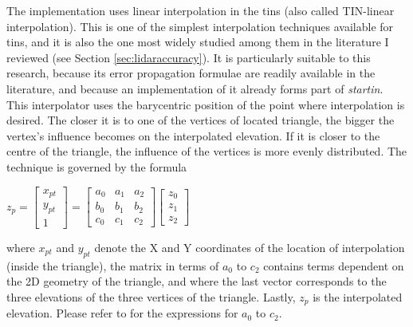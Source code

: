 The implementation uses linear interpolation in the \ac{tin}s (also called TIN-linear interpolation). This is one of the simplest interpolation techniques available for \ac{tin}s, and it is also the one most widely studied among them in the literature I reviewed (see Section \ref{sec:lidaraccuracy}). It is particularly suitable to this research, because its error propagation formulae are readily available in the literature, and because an implementation of it already forms part of \textit{startin}. This interpolator uses the barycentric position of the point where interpolation is desired. The closer it is to one of the vertices of located triangle, the bigger the vertex's influence becomes on the interpolated elevation. If it is closer to the centre of the triangle, the influence of the vertices is more evenly distributed. The technique is governed by the formula

$z_{p} =
\begin{bmatrix}
x_{pt}\\
y_{pt}\\ 
1
\end{bmatrix} =
\begin{bmatrix}
 a_{0} & a_{1} & a_{2} \\
 b_{0} & b_{1} & b_{2} \\
 c_{0} & c_{1} & c_{2}  
\end{bmatrix}
\begin{bmatrix}
z_{0}\\
z_{1}\\ 
z_{2}
\end{bmatrix}$

where $x_{pt}$ and $y_{pt}$ denote the X and Y coordinates of the location of interpolation (inside the triangle), the matrix in terms of $a_{0}$ to $c_{2}$ contains terms dependent on the 2D geometry of the triangle, and where the last vector corresponds to the three elevations of the three vertices of the triangle. Lastly, $z_{p}$ is the interpolated elevation. Please refer to \cite{fan_etal_2014} for the expressions for $a_{0}$ to $c_{2}$.

